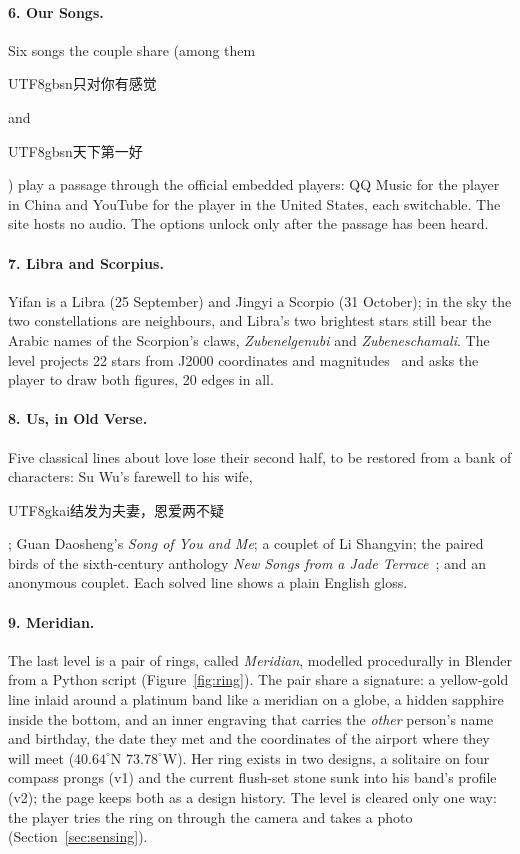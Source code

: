 \documentclass[sigconf,nonacm]{acmart}
\newcommand{\zh}[1]{\begin{CJK*}{UTF8}{gbsn}#1\end{CJK*}}
\newcommand{\kai}[1]{\begin{CJK*}{UTF8}{gkai}#1\end{CJK*}}
\begin{document}
\paragraph{6. Our Songs.} Six songs the couple share (among them \zh{只对你有感觉} and
\zh{天下第一好}) play a passage through the official embedded players: QQ Music for the player in
China and YouTube for the player in the United States, each switchable. The site hosts no audio.
The options unlock only after the passage has been heard.

\paragraph{7. Libra and Scorpius.} Yifan is a Libra (25 September) and Jingyi a Scorpio
(31 October); in the sky the two constellations are neighbours, and Libra's two brightest stars
still bear the Arabic names of the Scorpion's claws, \emph{Zubenelgenubi} and
\emph{Zubeneschamali}. The level projects 22 stars from J2000 coordinates and
magnitudes~\cite{meeus1998astronomical} and asks the player to draw both figures, 20 edges in all.

\paragraph{8. Us, in Old Verse.} Five classical lines about love lose their second half, to be
restored from a bank of characters: Su Wu's farewell to his wife, \kai{结发为夫妻，恩爱两不疑};
Guan Daosheng's \emph{Song of You and Me}; a couplet of Li Shangyin; the paired birds of the
sixth-century anthology \emph{New Songs from a Jade Terrace}~\cite{birrell1982jade}; and an
anonymous couplet. Each solved line shows a plain English gloss.

\paragraph{9. Meridian.} The last level is a pair of rings, called \emph{Meridian}, modelled
procedurally in Blender from a Python script (Figure~\ref{fig:ring}). The pair share a signature:
a yellow-gold line inlaid around a platinum band like a meridian on a globe, a hidden sapphire
inside the bottom, and an inner engraving that carries the \emph{other} person's name and birthday,
the date they met and the coordinates of the airport where they will meet ($40.64^\circ$N
$73.78^\circ$W). Her ring exists in two designs, a solitaire on four compass prongs (v1) and the
current flush-set stone sunk into his band's profile (v2); the page keeps both as a design history.
The level is cleared only one way: the player tries the ring on through the camera and takes a
photo (Section~\ref{sec:sensing}).
\end{document}

